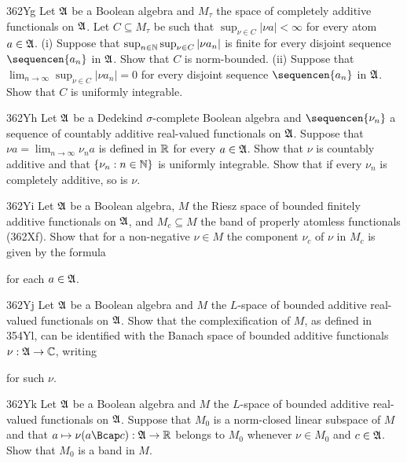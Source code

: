 {\spheader 362Yg Let $\frak A$ be a Boolean algebra and $M_{\tau}$ the
space of completely additive functionals on $\frak A$.   Let
$C\subseteq M_{\tau}$ be such that $\sup_{\nu\in C}|\nu a|<\infty$ for
every atom $a\in\frak A$.  (i) Suppose that
$\sup_{n\in\Bbb N}\sup_{\nu\in C}|\nu a_n|$ is finite for every disjoint
sequence $\sequencen{a_n}$ in $\frak A$.   Show that $C$ is
norm-bounded.   (ii) Suppose that
$\lim_{n\to\infty}\sup_{\nu\in C}|\nu a_n|=0$ for every disjoint
sequence $\sequencen{a_n}$ in $\frak A$.   Show that $C$ is uniformly
integrable.

\spheader 362Yh Let $\frak A$ be a Dedekind $\sigma$-complete Boolean
algebra and $\sequencen{\nu_n}$ a sequence of countably additive
real-valued functionals on $\frak A$.   Suppose that
$\nu a=\lim_{n\to\infty}\nu_na$ is defined in $\Bbb R$ for every
$a\in\frak A$.   Show that $\nu$ is countably additive and that
$\{\nu_n:n\in\Bbb N\}$ is uniformly integrable.      Show
that if every $\nu_n$ is completely additive, so is $\nu$.

\spheader 362Yi Let $\frak A$ be a Boolean algebra, $M$ the Riesz space
of bounded finitely additive functionals on $\frak A$, and
$M_c\subseteq M$ the band of properly atomless functionals (362Xf).
Show that for a
non-negative $\nu\in M$ the component $\nu_c$ of $\nu$ in $M_c$ is given
by the formula


\noindent for each $a\in\frak A$.

\spheader 362Yj Let $\frak A$ be a Boolean algebra and $M$ the
$L$-space of bounded additive real-valued functionals on $\frak A$.
Show that the complexification of $M$, as defined in 354Yl, can be
identified with the Banach space of bounded additive functionals
$\nu:\frak A\to\Bbb C$, writing


\noindent for such $\nu$.

\spheader 362Yk Let $\frak A$ be a Boolean algebra and $M$ the $L$-space of
bounded additive real-valued functionals on $\frak A$.   Suppose that $M_0$
is a norm-closed linear subspace of $M$ and that
$a\mapsto\nu(a\Bcap c):\frak A\to\Bbb R$ belongs to $M_0$
whenever $\nu\in M_0$ and $c\in\frak A$.   Show that $M_0$ is a band in
$M$.   
}%

